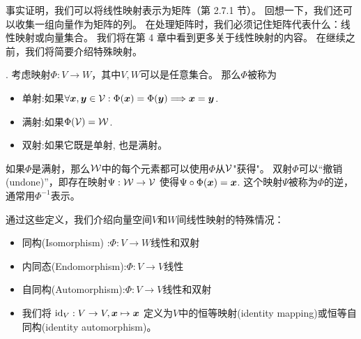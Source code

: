 事实证明，我们可以将线性映射表示为矩阵（第 2.7.1 节）。
回想一下，我们还可以收集一组向量作为矩阵的列。
在处理矩阵时，我们必须记住矩阵代表什么：线性映射或向量集合。
我们将在第 4 章中看到更多关于线性映射的内容。
在继续之前，我们将简要介绍特殊映射。

\begin{definition}[单射、满射、双射].
    考虑映射$\Phi:V \rightarrow W$，其中$V, W$可以是任意集合。
    那么$\Phi$被称为
    \begin{itemize}
        \item 单射:如果$\forall \boldsymbol{x},\boldsymbol{y} \in \mathcal{V}:
               \Phi(\boldsymbol{x}) = \Phi(\boldsymbol{y}) \Longrightarrow \boldsymbol{x} = \boldsymbol{y}$.
        \item 满射:如果$\Phi(\mathcal{V})=\mathcal{W}$.
        \item 双射:如果它既是单射, 也是满射。
    \end{itemize}
\end{definition}

如果$\Phi$是满射，那么$\mathcal{W}$中的每个元素都可以使用$\Phi$从$\mathcal{V}$"获得"。
双射$\Phi$可以“撤销(undone)”，即存在映射$\Psi:\mathcal{W} \rightarrow \mathcal{V}$
使得$\Psi \circ \Phi(\boldsymbol{x}) = \boldsymbol{x}$.
这个映射$\Psi$被称为$\Phi$的逆，通常用$\Phi^{−1}$表示。

通过这些定义，我们介绍向量空间$V$和$W$间线性映射的特殊情况：
\begin{itemize}
    \item 同构(Isomorphism)   :$\Phi:V \rightarrow W$线性和双射
    \item 内同态(Endomorphism):$\Phi:V \rightarrow V$线性
    \item 自同构(Automorphism):$\Phi:V \rightarrow V$线性和双射
    \item 我们将 $\mathrm{id}_V:V \rightarrow V ,\boldsymbol{x} \mapsto \boldsymbol{x}$
          定义为$V$中的恒等映射(identity mapping)或恒等自同构(identity automorphism)。
\end{itemize}

